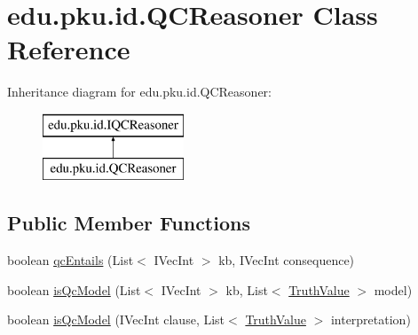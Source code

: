 \hypertarget{classedu_1_1pku_1_1id_1_1_q_c_reasoner}{
\section{edu.pku.id.QCReasoner Class Reference}
\label{classedu_1_1pku_1_1id_1_1_q_c_reasoner}
}
Inheritance diagram for edu.pku.id.QCReasoner:\begin{figure}[H]
\begin{center}
\leavevmode
\includegraphics[height=2.000000cm]{classedu_1_1pku_1_1id_1_1_q_c_reasoner}
\end{center}
\end{figure}
\subsection*{Public Member Functions}
\begin{DoxyCompactItemize}
\item 
boolean \hyperlink{classedu_1_1pku_1_1id_1_1_q_c_reasoner_a0ce01daedfae2f88548978205d4848db}{qcEntails} (List$<$ IVecInt $>$ kb, IVecInt consequence)
\item 
boolean \hyperlink{classedu_1_1pku_1_1id_1_1_q_c_reasoner_a98bdf18d6a8222310060877e6cff6d80}{isQcModel} (List$<$ IVecInt $>$ kb, List$<$ \hyperlink{namespaceedu_1_1pku_1_1id_a01cdd35063021f272bd905de5f43f634}{TruthValue} $>$ model)
\item 
boolean \hyperlink{classedu_1_1pku_1_1id_1_1_q_c_reasoner_a63fc892ce36a74721446c691c60cdbd1}{isQcModel} (IVecInt clause, List$<$ \hyperlink{namespaceedu_1_1pku_1_1id_a01cdd35063021f272bd905de5f43f634}{TruthValue} $>$ interpretation)
\end{DoxyCompactItemize}
